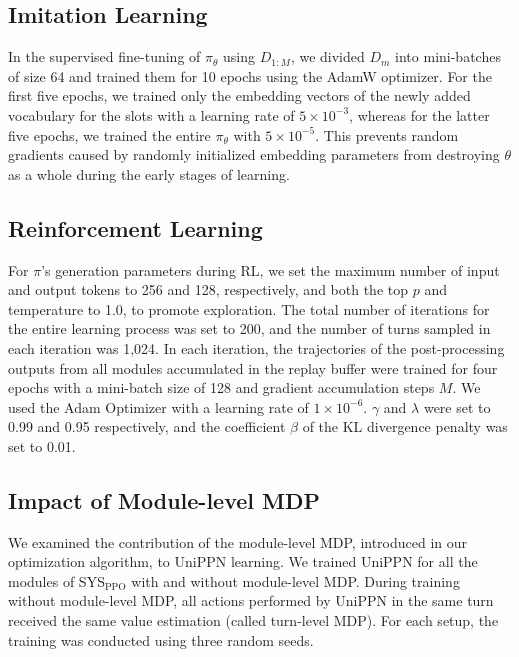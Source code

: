 \subsection{Imitation Learning}
In the supervised fine-tuning of $\pi_\theta$ using $D_{1:M}$, we divided $D_m$ into mini-batches of size 64 and trained them for 10 epochs using the AdamW optimizer. For the first five epochs, we trained only the embedding vectors of the newly added vocabulary for the slots with a learning rate of $5 \times 10^{-3}$, whereas for the latter five epochs, we trained the entire $\pi_\theta$ with $5 \times 10^{-5}$. This prevents random gradients caused by randomly initialized embedding parameters from destroying $\theta$ as a whole during the early stages of learning.

\subsection{Reinforcement Learning}
For $\pi$'s generation parameters during RL, we set the maximum number of input and output tokens to 256 and 128, respectively, and both the top $p$ and temperature to 1.0, to promote exploration. The total number of iterations for the entire learning process was set to 200, and the number of turns sampled in each iteration was 1,024. In each iteration, the trajectories of the post-processing outputs from all modules accumulated in the replay buffer were trained for four epochs with a mini-batch size of 128 and gradient accumulation steps $M$. We used the Adam Optimizer with a learning rate of $1 \times 10^{-6}$. $\gamma$ and $\lambda$ were set to 0.99 and 0.95 respectively, and the coefficient $\beta$ of the KL divergence penalty was set to 0.01.

\subsection{Impact of Module-level MDP}
\label{appendix:sec:impact_module_level_mdp}

We examined the contribution of the module-level MDP, introduced in our optimization algorithm, to UniPPN learning. We trained UniPPN for all the modules of SYS$_\text{PPO}$ with and without module-level MDP. During training without module-level MDP, all actions performed by UniPPN in the same turn received the same value estimation (called turn-level MDP). For each setup, the training was conducted using three random seeds.

